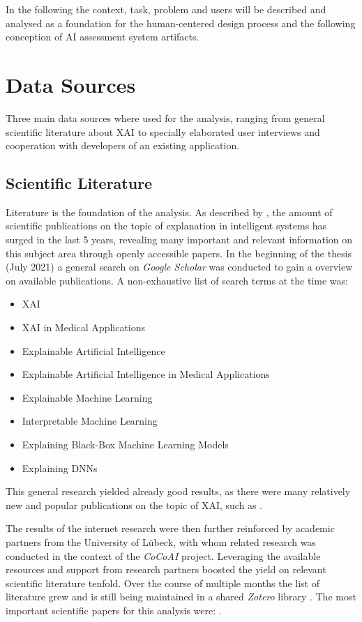 \documentclass[11pt,a4paper,english]{scrreprt}
\begin{document}
In the following the context, task, problem and users will be described and analysed as a foundation for the human-centered design process and the following conception of AI assessment system artifacts.

\section{Data Sources}
Three main data sources where used for the analysis, ranging from general scientific literature about XAI to specially elaborated user interviews and cooperation with developers of an existing application.

\subsection{Scientific Literature}
Literature is the foundation of the analysis. As described by \textcite{mueller_explanation_2019}, the amount of scientific publications on the topic of explanation in intelligent systems has surged in the last 5 years, revealing many important and relevant information on this subject area through openly accessible papers. In the beginning of the thesis (July 2021) a general search on \textit{Google Scholar} was conducted to gain a overview on available publications. A non-exhaustive list of search terms at the time was:
\begin{itemize}
    \item XAI
    \item XAI in Medical Applications
    \item Explainable Artificial Intelligence
    \item Explainable Artificial Intelligence in Medical Applications
    \item Explainable Machine Learning
    \item Interpretable Machine Learning
    \item Explaining Black-Box Machine Learning Models
    \item Explaining DNNs
\end{itemize}
This general research yielded already good results, as there were many relatively new and popular publications on the topic of XAI, such as \textcite{mueller_explanation_2019, ras_explanation_2018, adadi_blackbox_2018, hoffman_metrics_2019}.

The results of the internet research were then further reinforced by academic partners from the University of Lübeck, with whom related research was conducted in the context of the \textit{CoCoAI} project. Leveraging the available resources and support from research partners boosted the yield on relevant scientific literature tenfold. Over the course of multiple months the list of literature grew and is still being maintained in a shared \textit{Zotero} library \parencite{zotero_website}. The most important scientific papers for this analysis were: \textcite{ras_explanation_2018, arrieta_explainable_2019, ribeiro_why_2016, adadi_blackbox_2018,knapic_explainable_2021, samek_explaining_2021, chiou_trusting_2021, hoffman_metrics_2019}. 
\end{document}

